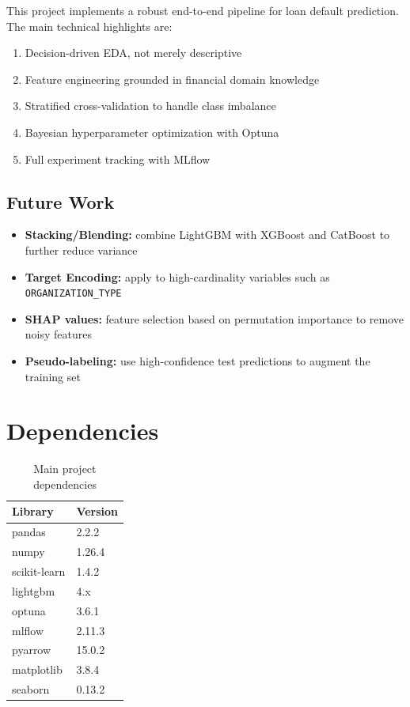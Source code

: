 \documentclass[12pt, a4paper]{article}
\begin{document}
This project implements a robust end-to-end pipeline for loan default prediction.
The main technical highlights are:

\begin{enumerate}
    \item Decision-driven EDA, not merely descriptive
    \item Feature engineering grounded in financial domain knowledge
    \item Stratified cross-validation to handle class imbalance
    \item Bayesian hyperparameter optimization with Optuna
    \item Full experiment tracking with MLflow
\end{enumerate}

\subsection{Future Work}

\begin{itemize}
    \item \textbf{Stacking/Blending:} combine LightGBM with XGBoost and CatBoost to
          further reduce variance
    \item \textbf{Target Encoding:} apply to high-cardinality variables such as
          \texttt{ORGANIZATION\_TYPE}
    \item \textbf{SHAP values:} feature selection based on permutation importance to
          remove noisy features
    \item \textbf{Pseudo-labeling:} use high-confidence test predictions to augment
          the training set
\end{itemize}

\appendix
\section{Dependencies}

\begin{table}[H]
\centering
\begin{tabular}{ll}
\toprule
\textbf{Library} & \textbf{Version} \\
\midrule
pandas       & 2.2.2  \\
numpy        & 1.26.4 \\
scikit-learn & 1.4.2  \\
lightgbm     & 4.x    \\
optuna       & 3.6.1  \\
mlflow       & 2.11.3 \\
pyarrow      & 15.0.2 \\
matplotlib   & 3.8.4  \\
seaborn      & 0.13.2 \\
\bottomrule
\end{tabular}
\caption{Main project dependencies}
\end{table}
\end{document}
